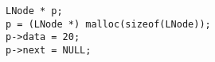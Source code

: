 \begin{lstlisting}
LNode * p;
p = (LNode *) malloc(sizeof(LNode));
p->data = 20;
p->next = NULL;
\end{lstlisting}